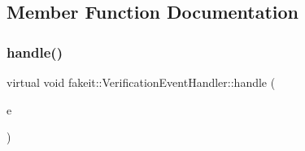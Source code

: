 \subsection{Member Function Documentation}
\mbox{\label{structfakeit_1_1VerificationEventHandler_adf355a9888bc2bf78ce0e1219bfb1379}} 
\subsubsection{\texorpdfstring{handle()}{handle()}\hspace{0.1cm}{\footnotesize\ttfamily [1/18]}}
{\footnotesize\ttfamily virtual void fakeit\+::\+Verification\+Event\+Handler\+::handle (\begin{DoxyParamCaption}\item[{const \mbox{\hyperlink{structfakeit_1_1SequenceVerificationEvent}{Sequence\+Verification\+Event}} \&}]{e }\end{DoxyParamCaption})\hspace{0.3cm}{\ttfamily [pure virtual]}}



